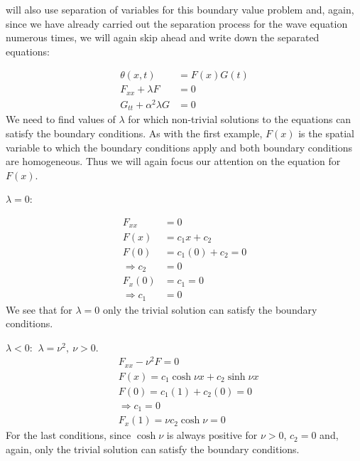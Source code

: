  will also use separation of variables for this boundary value problem and, again, since we have already carried out the separation process for the wave equation numerous times, we will again skip ahead and write down the separated equations:

\begin{align*}
\theta(x,t) &= F(x)G(t) \\
F_{xx} + \lambda F &= 0 \\
G_{tt} + \alpha^2 \lambda G &= 0
\end{align*}
We need to find values of $\lambda$ for which non-trivial solutions to the equations can satisfy the boundary conditions.  As with the first example, $F(x)$ is the spatial variable to which the boundary conditions apply and both boundary conditions are homogeneous.  Thus we will again focus our attention on the equation for $F(x)$.

\vspace{0.25cm}

\noindent\underline{$\lambda = 0$}:

\begin{align*}
F_{xx} &= 0 \\
F(x) &= c_1x + c_2 \\
F(0) &= c_1(0) + c_2 = 0 \\
\Rightarrow c_2 &= 0 \\
F_{x}(0) &= c_1 = 0 \\
\Rightarrow c_1 &= 0
\end{align*}
We see that for $\lambda = 0$ only the trivial solution can satisfy the boundary conditions.

\vspace{0.25cm}

\noindent\underline{$\lambda < 0$}: $\ \lambda = \nu^2, \ \nu>0$.
\begin{align*}
&F_{xx} - \nu^2 F = 0 \\
&F(x) = c_1 \cosh{\nu x} + c_2 \sinh{\nu x} \\
&F(0) = c_1(1) + c_2(0) = 0 \\
&\Rightarrow c_1 = 0 \\
&F_{x}(1) = \nu c_2 \cosh{\nu} = 0
\end{align*} 
For the last conditions, since $\cosh{\nu}$ is always positive for $\nu>0$, $c_2 = 0$ and, again, only the trivial solution can satisfy the boundary conditions.

